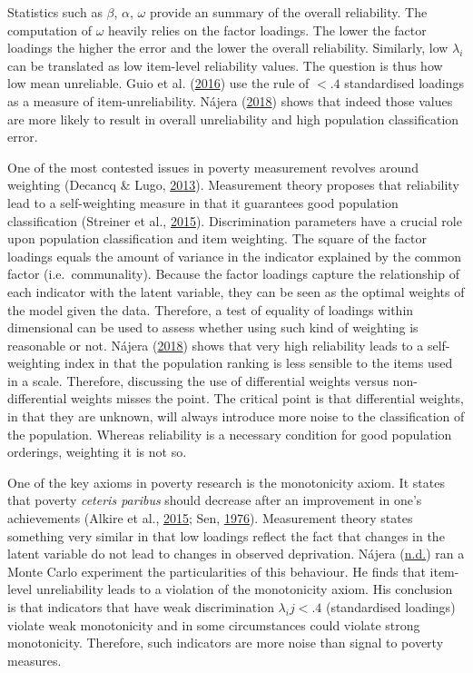 \documentclass[]{book}
\begin{document}
Statistics such as \(\beta\), \(\alpha\), \(\omega\) provide an summary of the overall reliability. The computation of \(\omega\) heavily relies on the factor loadings. The lower the factor loadings the higher the error and the lower the overall reliability. Similarly, low \(\lambda_{i}\) can be translated as low item-level reliability values. The question is thus how low mean unreliable. Guio et al. (\protect\hyperlink{ref-Guio2016}{2016}) use the rule of \(<.4\) standardised loadings as a measure of item-unreliability. Nájera (\protect\hyperlink{ref-Najera2018}{2018}) shows that indeed those values are more likely to result in overall unreliability and high population classification error.

One of the most contested issues in poverty measurement revolves around weighting (Decancq \& Lugo, \protect\hyperlink{ref-Decancq2013}{2013}). Measurement theory proposes that reliability lead to a self-weighting measure in that it guarantees good population classification (Streiner et al., \protect\hyperlink{ref-Streiner2015}{2015}). Discrimination parameters have a crucial role upon population classification and item weighting. The square of the factor loadings equals the amount of variance in the indicator explained by the common factor (i.e.~communality). Because the factor loadings capture the relationship of each indicator with the latent variable, they can be seen as the optimal weights of the model given the data. Therefore, a test of equality of loadings within dimensional can be used to assess whether using such kind of weighting is reasonable or not. Nájera (\protect\hyperlink{ref-Najera2018}{2018}) shows that very high reliability leads to a self-weighting index in that the population ranking is less sensible to the items used in a scale. Therefore, discussing the use of differential weights versus non-differential weights misses the point. The critical point is that differential weights, in that they are unknown, will always introduce more noise to the classification of the population. Whereas reliability is a necessary condition for good population orderings, weighting it is not so.

One of the key axioms in poverty research is the monotonicity axiom. It states that poverty \emph{ceteris paribus} should decrease after an improvement in one's achievements (Alkire et al., \protect\hyperlink{ref-Alkire2015}{2015}; Sen, \protect\hyperlink{ref-Sen1976}{1976}). Measurement theory states something very similar in that low loadings reflect the fact that changes in the latent variable do not lead to changes in observed deprivation. Nájera (\protect\hyperlink{ref-NajeraForthcoming}{n.d.}) ran a Monte Carlo experiment the particularities of this behaviour. He finds that item-level unreliability leads to a violation of the monotonicity axiom. His conclusion is that indicators that have weak discrimination \(\lambda_ij<.4\) (standardised loadings) violate weak monotonicity and in some circumstances could violate strong monotonicity. Therefore, such indicators are more noise than signal to poverty measures.
\end{document}
